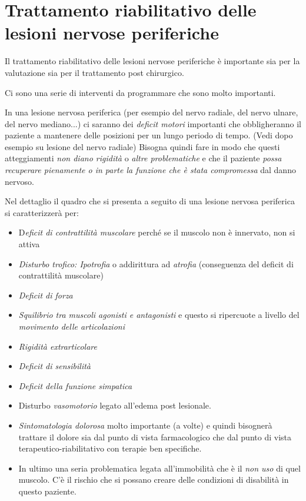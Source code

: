 \section{Trattamento riabilitativo delle lesioni nervose periferiche}

Il trattamento riabilitativo delle lesioni nervose periferiche è importante sia per la valutazione sia per il trattamento post chirurgico.

Ci sono una serie di interventi da programmare che sono molto importanti.

In una lesione nervosa periferica (per esempio del nervo radiale, del
nervo ulnare, del nervo mediano...) ci saranno dei \emph{deficit motori}
importanti che obbligheranno il paziente a mantenere delle posizioni per
un lungo periodo di tempo. (Vedi dopo esempio su lesione del nervo
radiale) Bisogna quindi fare in modo che questi atteggiamenti \emph{non
diano rigidità} o \emph{altre problematiche} e che il paziente
\emph{possa recuperare pienamente o in parte la funzione che è stata
compromessa} dal danno nervoso.

Nel dettaglio il quadro che si presenta a seguito di una lesione nervosa
periferica si caratterizzerà per:

\begin{itemize}
\item
  D\emph{eficit di contrattilità muscolare} perché se il muscolo non è
  innervato, non si attiva
\item
  \emph{Disturbo trofico: Ipotrofia} o addirittura ad \emph{atrofia}
  (conseguenza del deficit di contrattilità muscolare)
\item
  \emph{Deficit di forza }
\item
  \emph{Squilibrio tra muscoli agonisti e antagonisti} e questo si
  ripercuote a livello del \emph{movimento delle articolazioni}
\item
  \emph{Rigidità extrarticolare }
\item
  \emph{Deficit di sensibilità}
\item
  \emph{Deficit della funzione simpatica}
\item
  Disturbo \emph{vasomotorio} legato all'edema post lesionale.
\item
  \emph{Sintomatologia dolorosa} molto importante (a volte) e quindi
  bisognerà trattare il dolore sia dal punto di vista farmacologico che
  dal punto di vista terapeutico-riabilitativo con terapie ben
  specifiche.
\item
  In ultimo una seria problematica legata all'immobilità che è il
  \emph{non uso} di quel muscolo. C'è il rischio che si possano creare
  delle condizioni di disabilità in questo paziente.
\end{itemize}

